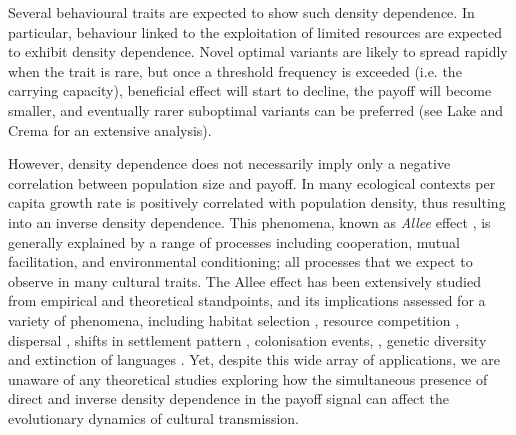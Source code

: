 \documentclass[3p,authoryear,twocolumn]{elsarticle} %
\begin{document}
Several behavioural traits are expected to show such density dependence. In particular, behaviour linked to the exploitation of limited resources are expected to exhibit density dependence. Novel optimal variants are likely to spread rapidly when the trait is rare, but once a threshold frequency is exceeded (i.e. the carrying capacity),  beneficial effect will start to decline, the payoff will become smaller, and eventually rarer suboptimal variants can be preferred (see Lake and Crema \citeyear{lake_and_crema_2012} for an extensive analysis). 

However, density dependence does not necessarily imply only a negative correlation between population size and payoff. In many ecological contexts per capita growth rate is positively correlated with population density, thus resulting into an inverse density dependence. This phenomena, known as \emph{Allee} effect \citep{allee1958,courchamp_etal_1999}, is generally explained by a range of processes including cooperation, mutual facilitation, and environmental conditioning; all processes that we expect to observe  in many cultural traits. The Allee effect has been extensively studied  from  empirical and theoretical standpoints, and its implications assessed for a variety of phenomena, including habitat selection \citep{greene_and_stamps_2001}, resource competition \citep{jang2013},  dispersal \citep{steele_2009}, shifts in settlement pattern \citep{crema_2014}, colonisation events,  \citep{kennet_etal_2006}, genetic diversity \citep{roques_etal_2012} and extinction of languages \citep{sutherland_2003} . Yet, despite this wide array of applications, we are unaware of any theoretical studies exploring how the simultaneous presence of direct and inverse density dependence in the payoff signal can affect the evolutionary dynamics of cultural transmission.   
\end{document}
